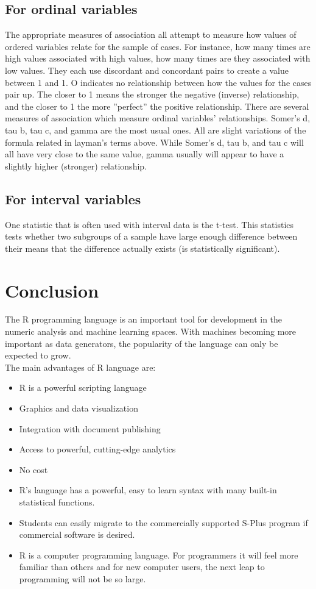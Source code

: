 \subsection{For ordinal variables}
The appropriate measures of association all attempt to measure how values of ordered variables relate for the sample of cases. For instance, how many times are high values associated with high values, how many times are they associated
with low values. They each use discordant and concordant pairs to create a value between 1 and 1. O indicates no
relationship between how the values for the cases pair up. The closer to 1 means the stronger the negative (inverse)
relationship, and the closer to 1 the more ”perfect” the positive relationship. There are several measures of association which measure ordinal variables’ relationships. Somer’s d, tau b, tau c, and gamma are the most usual ones. All are slight variations of the formula related in layman’s terms above. While Somer’s d, tau b, and tau c will all have very close to the same value, gamma usually will appear to have a slightly higher (stronger) relationship.

\subsection{For interval variables}
One statistic that is often used with interval data is the t-test. This statistics tests whether two subgroups of a sample have large enough difference between their means that the difference actually exists (is statistically significant).

\section{Conclusion}

The R programming language is an important tool for development in the numeric analysis and machine learning spaces. With machines becoming more important as data generators, the popularity of the language can only be expected to grow.\\

The main advantages of R language are:\\
\begin{itemize}
\item R is a powerful scripting language
\item Graphics and data visualization
\item Integration with document publishing
\item Access to powerful, cutting-edge analytics
\item No cost
\item R’s language has a powerful, easy to learn syntax with many built-in statistical functions.
\item Students can easily migrate to the commercially supported S-Plus program if commercial software is desired.
\item R is a computer programming language. For programmers it will feel more familiar than others and for new
computer users, the next leap to programming will not be so large.
\end{itemize}

